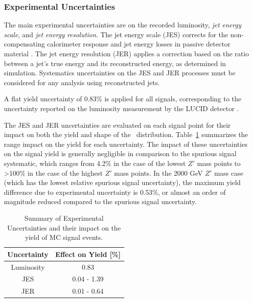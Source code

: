 \subsubsection{Experimental Uncertainties}
The main experimental uncertainties are on the recorded luminosity, \textit{jet energy scale}, and \textit{jet energy resolution}.
The jet energy scale (JES) corrects for the non-compensating calorimeter response and jet energy losses in passive detector material \cite{jes_jer}.
The jet energy resolution (JER) applies a correction based on the ratio between a jet's true energy and its reconstructed energy, as determined in simulation.
Systematics uncertainties on the JES and JER processes must be considered for any analysis using reconstructed jets.

A flat yield uncertainty of 0.83\% is applied for all signals, corresponding to the uncertainty reported on the luminosity measurement by the LUCID detector \cite{lucid_uncertainty}. 

The JES and JER uncertainties are evaluated on each signal point for their impact on both the yield and shape of the \mt~distribution.
Table~\ref{tab:exp_syst} summarizes the range impact on the yield for each uncertainty.
The impact of these uncertainties on the signal yield is generally negligible in comparison to the spurious signal systematic, which ranges from 4.2\% in the case of the lowest $Z'$ mass points to >100\% in the case of the highest $Z'$ mass points.
In the 2000 GeV $Z'$ mass case (which has the lowest relative spurious signal uncertainty), the maximum yield difference due to experimental uncertainty is 0.53\%, or almost an order of magnitude reduced compared to the spurious signal uncertainty.

\begin{table}
\centering
  \begin{tabular}{ |c|c| }
    \hline
    Uncertainty & Effect on Yield [\%] \\
    \hline
     Luminosity & 0.83 \\
     JES & 0.04 - 1.39 \\
     JER & 0.01 - 0.64 \\
    \hline
  \end{tabular}
  \caption{Summary of Experimental Uncertainties and their impact on the yield of MC signal events.}
  \label{tab:exp_syst}
\end{table}

